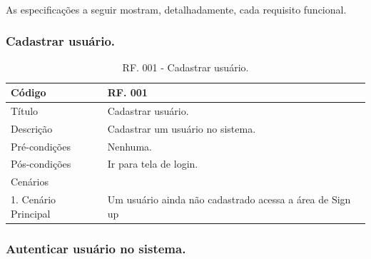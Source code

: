 \documentclass[11pt]{article}
\begin{document}
    \paragraph{}
    As especificações a seguir mostram, detalhadamente, cada requisito funcional.
    
      \subsubsection{Cadastrar usuário.}
      
        \begin{table}[h]
          \begin{center}
              \begin{tabular}{ | p{5cm} | p{10cm} | }
                \hline
                Código\cellcolor{gray} & RF. 001\cellcolor{gray} \\
                \hline
                Título & Cadastrar usuário. \\
                \hline
                Descrição & Cadastrar um usuário no sistema. \\
                \hline
                Pré-condições & Nenhuma. \\
                \hline
                Pós-condições & Ir para tela de login. \\
                \hline
                Cenários &   \\
                \hline
                1.  Cenário Principal & Um usuário ainda não cadastrado acessa a área de Sign up \\
                \hline
              \end{tabular}
            \caption{RF. 001 - Cadastrar usuário.}
          \end{center}
        \end{table}

      \subsubsection{Autenticar usuário no sistema.}
\end{document}
